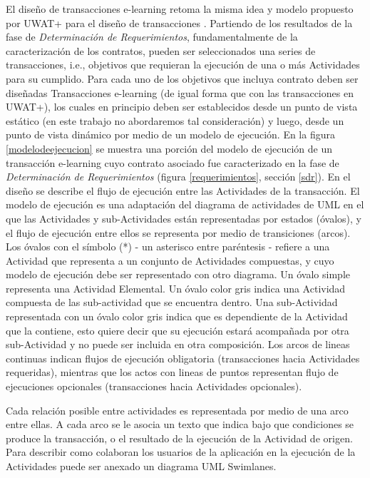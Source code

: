 El diseño de transacciones e-learning retoma la misma idea y modelo propuesto
por UWAT+ para el diseño de transacciones \cite{UWAT}. Partiendo de los
resultados de la fase de \textit{Determinación de Requerimientos},
fundamentalmente de la caracterización de los contratos, pueden ser
seleccionados una series de transacciones, i.e., objetivos que requieran la
ejecución de una o más Actividades para su cumplido. Para cada uno de los
objetivos que incluya contrato deben ser diseñadas Transacciones e-learning (de
igual forma que con las transacciones en UWAT+), los cuales en principio deben
ser establecidos desde un punto de vista estático (en este trabajo no
abordaremos tal consideración) y luego, desde un punto de vista dinámico por
medio de un modelo de ejecución. En la figura \ref{modelodeejecucion} se muestra
una porción del modelo de ejecución de un transacción e-learning cuyo contrato
asociado fue caracterizado en la fase de \textit{Determinación de
Requerimientos} (figura \ref{requerimientos}, sección \ref{sdr}). En el diseño
se describe el flujo de ejecución entre las Actividades de la transacción. El
modelo de ejecución es una adaptación del diagrama de actividades de UML
\cite{7} en el que las Actividades y sub-Actividades están representadas por
estados (óvalos), y el flujo de ejecución entre ellos se representa por medio de
transiciones (arcos). Los óvalos con el símbolo (*) - un asterisco entre
paréntesis - refiere a una Actividad que representa a un conjunto de Actividades
compuestas, y cuyo modelo de ejecución debe ser representado con otro diagrama.
Un óvalo simple representa una Actividad Elemental. Un óvalo color gris indica
una Actividad compuesta de las sub-actividad que se encuentra dentro. Una
sub-Actividad representada con un óvalo color gris indica que es dependiente de
la Actividad que la contiene, esto quiere decir que su ejecución estará
acompañada por otra sub-Actividad y no puede ser incluida en otra composición.
Los arcos de lineas continuas indican flujos de ejecución obligatoria
(transacciones hacia Actividades requeridas), mientras que los actos con lineas
de puntos representan flujo de ejecuciones opcionales  (transacciones hacia
Actividades opcionales).
 
Cada relación posible entre actividades es representada por medio de una arco
entre ellas. A cada arco se le asocia un texto que indica bajo que condiciones
se produce la transacción, o el resultado de la ejecución de la Actividad de
origen. Para describir como colaboran los usuarios de la aplicación en la
ejecución de la Actividades puede ser anexado un diagrama UML Swimlanes. 

